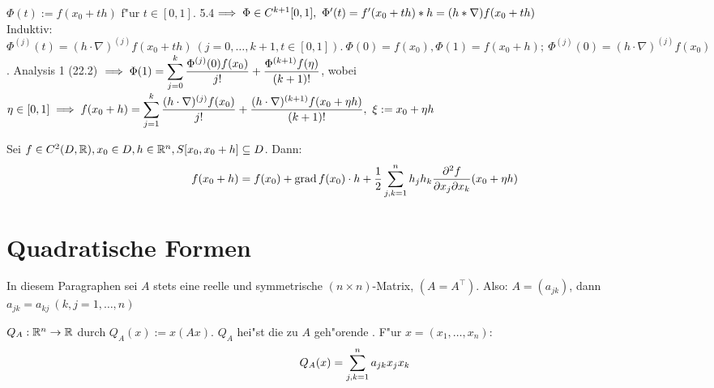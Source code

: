 \documentclass[a4paper,twoside,DIV15,BCOR12mm,chapterprefix=true,headings=twolinechapter]{scrbook}
\begin{document}
\begin{beweis}
$\Phi(t):=f(x_0+th)$ f"ur $t\in[0,1]$. 5.4$\folgt \Phi \in C^{k+1}[0,1],\ \Phi'(t)=f'(x_0+th)*h=(h*\nabla)f(x_0+th)$\\
Induktiv: $\Phi^{(j)}(t)=(h\cdot\nabla)^{(j)}f(x_0+th)\ (j=0,\ldots,k+1, t\in[0,1]).\ \Phi(0)=f(x_0), \Phi(1)=f(x_0+h);\ \Phi^{(j)}(0)=(h\cdot\nabla)^{(j)}f(x_0)$. Analysis 1 (22.2) $\implies \Phi(1)=\displaystyle\sum_{j=0}^k\frac{\Phi^{(j)}(0)f(x_0)}{j!}+\frac{\Phi^{(k+1)}f(\eta)}{(k+1)!}$, wobei $\eta\in[0,1]\implies f(x_0+h)=\displaystyle\sum_{j=1}^k\frac{(h\cdot\nabla)^{(j)}f(x_0)}{j!}+\frac{(h\cdot\nabla)^{(k+1)}f(x_0+\eta h)}{(k+1)!},\ \xi:=x_0+\eta h$
\end{beweis}

\begin{spezialfall}
Sei $f\in C^2(D,\mathbb{R}),x_0\in D, h\in \mathbb{R}^n, S[x_0,x_0+h]\subseteq D$. Dann: 
$$f(x_0+h)=f(x_0)+\grad f(x_0)\cdot h+\frac{1}{2}\sum_{j,k=1}^nh_jh_k\frac{\partial^2 f}{\partial x_j\partial x_k}(x_0+\eta h)$$
\end{spezialfall}

\chapter{Quadratische Formen}
\def\grad{\mathop{\rm grad}\nolimits}

\begin{vereinbarung}
In diesem Paragraphen sei $A$ stets eine reelle und symmetrische $(n\times n)$-Matrix, $(A=A^\top)$. Also: $A=(a_{jk})$, dann $a_{jk}=a_{kj}\ (k,j=1,\ldots,n)$ 
\end{vereinbarung}

\begin{definition*}
$Q_A:\mathbb{R}^n\to\mathbb{R}$ durch $Q_A(x):=x(Ax)$. $Q_A$ hei"st die zu $A$ geh"orende . F"ur $x=(x_1,\ldots,x_n):$
$$Q_A(x)=\displaystyle\sum_{j,k=1}^na_{jk}x_jx_k$$
\end{definition*}
\end{document}
